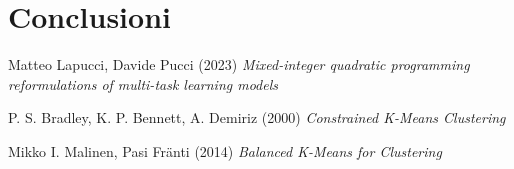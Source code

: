 \documentclass{article}
\begin{document}
    \section{Conclusioni}

    \begin{thebibliography}{9}
Matteo Lapucci, Davide Pucci (2023) \emph{Mixed-integer quadratic programming reformulations of multi-task learning models}

P. S. Bradley, K. P. Bennett, A. Demiriz (2000) \emph{Constrained K-Means Clustering}

Mikko I. Malinen, Pasi Fränti (2014) \emph{Balanced K-Means for Clustering}

\end{thebibliography}
\end{document}
